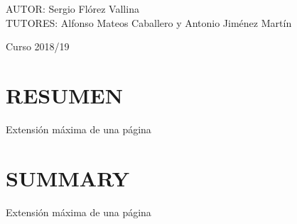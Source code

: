\documentclass[spanish,12pt, a4paper,twoside]{article}
\let\oldsection\section
\def\section{\cleardoublepage\oldsection}
\newcommand\blankpage{
    \null
    \thispagestyle{empty}
    \addtocounter{page}{-1}
    \newpage
}
\begin{document}
\begin{titlepage}
        \begin{flushright}
            \large
            AUTOR: Sergio Flórez Vallina\\
            TUTORES: Alfonso Mateos Caballero y \linebreak
            Antonio Jiménez Martín
        \end{flushright}

        \vspace{1.3cm}

        { {Curso 2018/19}}\\[3cm]

        \vfill

    \end{titlepage}

    \afterpage{\blankpage}


    \section*{RESUMEN}
    Extensión máxima de una página


    \section*{SUMMARY}
    Extensión máxima de una página


    \tableofcontents %



    \listoffigures

    \listoftables

    \newpage


    
    \newpage
\end{document}
